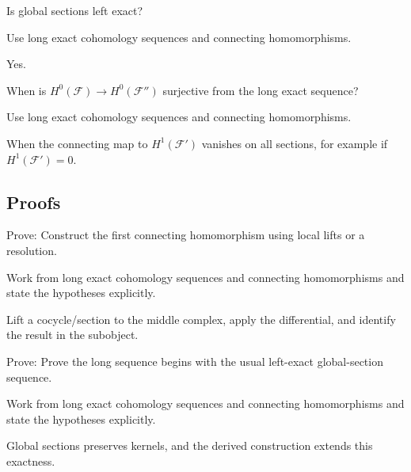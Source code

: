 \begin{exercise}[Exact H0]\label{exr:vi48-expand-04}
Is global sections left exact?
\end{exercise}
\begin{hint}
Use long exact cohomology sequences and connecting homomorphisms.
\end{hint}
\begin{solution}
Yes.
\end{solution}

\begin{exercise}\label{exr:vi48-expand-05}
When is $H^0(\mathcal F)\to H^0(\mathcal F'')$ surjective from the long exact sequence?
\end{exercise}
\begin{hint}
Use long exact cohomology sequences and connecting homomorphisms.
\end{hint}
\begin{solution}
When the connecting map to $H^1(\mathcal F')$ vanishes on all sections, for example if $H^1(\mathcal F')=0$.
\end{solution}

\subsection*{Proofs}

\begin{exercise}\label{exr:vi48-expand-06}
Prove: Construct the first connecting homomorphism using local lifts or a resolution.
\end{exercise}
\begin{hint}
Work from long exact cohomology sequences and connecting homomorphisms and state the hypotheses explicitly.
\end{hint}
\begin{solution}
Lift a cocycle/section to the middle complex, apply the differential, and identify the result in the subobject.
\end{solution}

\begin{exercise}[Exactness at H0]\label{exr:vi48-expand-07}
Prove: Prove the long sequence begins with the usual left-exact global-section sequence.
\end{exercise}
\begin{hint}
Work from long exact cohomology sequences and connecting homomorphisms and state the hypotheses explicitly.
\end{hint}
\begin{solution}
Global sections preserves kernels, and the derived construction extends this exactness.
\end{solution}


